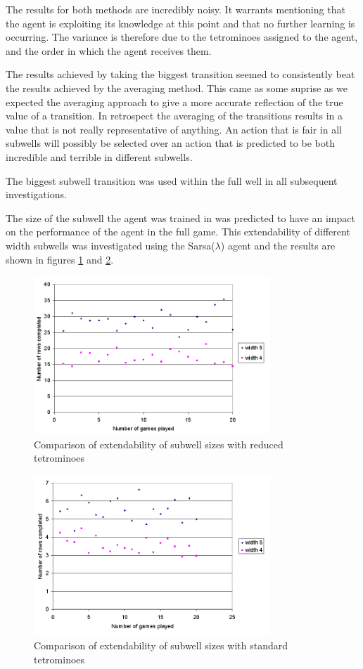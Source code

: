 \documentclass{rucsthesis}
\begin{document}
The results for both methods are incredibly noisy. It warrants mentioning that the agent is exploiting its knowledge at this point and that no further learning is occurring. The variance is therefore due to the tetrominoes assigned to the agent, and the order in which the agent receives them.

The results achieved by taking the biggest transition seemed to consistently beat the results achieved by the averaging method. This came as some suprise as we expected the averaging approach to give a more accurate reflection of the true value of a transition. In retrospect the averaging of the transitions results in a value that is not really representative of anything. An action that is fair in all subwells will possibly be selected over an action that is predicted to be both incredible and terrible in different subwells.

The biggest subwell transition was used within the full well in all subsequent investigations. 

The size of the subwell the agent was trained in was predicted to have an impact on the performance of the agent in the full game. This extendability of different width subwells was investigated using the Sarsa($\lambda$) agent and the results are shown in figures \ref{fig:widthcomparrison} and \ref{fig:widthcomparrisonfulltet}.

\begin{figure}[h]
\centering
\includegraphics[width=3.5in]{widthcomparrison.png}
\caption{Comparison of extendability of subwell sizes with reduced tetrominoes}
\label{fig:widthcomparrison}
\end{figure}

\begin{figure}[h]
\centering
\includegraphics[width=3.5in]{widthcomparrisonfulltet.png}
\caption{Comparison of extendability of subwell sizes with standard tetrominoes}
\label{fig:widthcomparrisonfulltet}
\end{figure}
\end{document}
